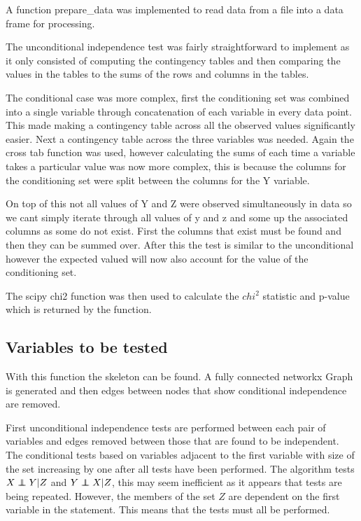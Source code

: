 \documentclass{UoYCSproject}
\newcommand\independent{\protect\mathpalette{\protect\independenT}{\perp}}
\def\independenT#1#2{\mathrel{\rlap{$#1#2$}\mkern2mu{#1#2}}}
\begin{document}
A function prepare\_data was implemented to read data from a file into a data frame for processing.

The unconditional independence test was fairly straightforward to implement as it only consisted of computing the contingency tables and then comparing the values in the tables to the sums of the rows and columns in the tables.

The conditional case was more complex, first the conditioning set was combined into a single variable through concatenation of each variable in every data point. This made making a contingency table across all the observed values significantly easier. Next a contingency table across the three variables was needed. Again the cross tab function was used, however calculating the sums of each time a variable takes a particular value was now more complex, this is because the columns for the conditioning set were split between the columns for the Y variable.

On top of this not all values of Y and Z were observed simultaneously in data so
we cant simply iterate through all values of y and z and some up the associated columns as some do not exist. First the columns that exist must be found and then they can be summed over. After this the test is similar to the unconditional however the expected valued will now also account for the value of the conditioning set.

The scipy chi2 function was then used to calculate the $chi^2$ statistic and p-value which is returned by the function.

\subsection{Variables to be tested}
With this function the skeleton can be found. A fully connected networkx Graph is generated and then edges between nodes that show conditional independence are removed. 

First unconditional independence tests are performed between each pair of variables and edges removed between those that are found to be independent. The conditional tests based on variables adjacent to the first variable with size of the set increasing by one after all tests have been performed. The algorithm tests $X \independent Y | Z$ and $Y \independent X | Z$, this may seem inefficient as it appears that tests are being repeated. However, the members of the set $Z$ are dependent on the first variable in the statement. This means that the tests must all be performed.
\end{document}
